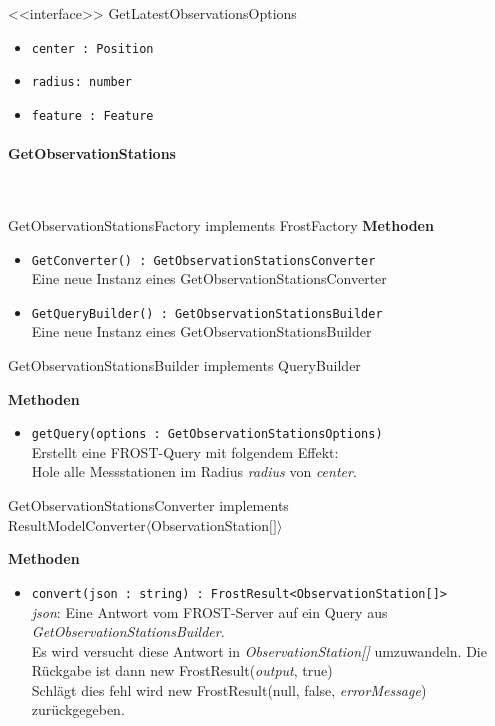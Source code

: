 \begin{Class}{<<interface>> GetLatestObservationsOptions}
    \begin{itemize}
        \item \texttt{center : Position}
        \item \texttt{radius: number}
        \item \texttt{feature : Feature}
    \end{itemize}
\end{Class}
\paragraph{GetObservationStations}\mbox{}\\

\begin{Class}{GetObservationStationsFactory implements FrostFactory}
    \textbf{Methoden}
    \begin{itemize}
        \item \texttt{GetConverter() : GetObservationStationsConverter}
        \\ Eine neue Instanz eines GetObservationStationsConverter
        \item \texttt{GetQueryBuilder() : GetObservationStationsBuilder}
        \\ Eine neue Instanz eines GetObservationStationsBuilder
    \end{itemize}
\end{Class}

\begin{Class}{GetObservationStationsBuilder implements QueryBuilder}

    \textbf{Methoden}
    \begin{itemize}
        \item \texttt{getQuery(options : GetObservationStationsOptions)}
        \\ Erstellt eine FROST-Query mit folgendem Effekt:
        \\ Hole alle Messstationen im Radius \emph{radius} von \emph{center}.
    \end{itemize}
\end{Class}

\begin{Class}{GetObservationStationsConverter implements \\ ResultModelConverter$\langle$ObservationStation$\lbrack\rbrack\rangle$}

    \textbf{Methoden}
    \begin{itemize}
        \item \texttt{convert(json : string) : FrostResult<ObservationStation[]>}
        \\ \emph{json}: Eine Antwort vom FROST-Server auf ein Query aus \emph{GetObservationStationsBuilder}.
        \\ Es wird versucht diese Antwort in \emph{ObservationStation[]} umzuwandeln.
        Die Rückgabe ist dann new FrostResult(\emph{output}, true)
        \\ Schlägt dies fehl wird new FrostResult(null, false, \emph{errorMessage}) zurückgegeben.
    \end{itemize}
\end{Class}

